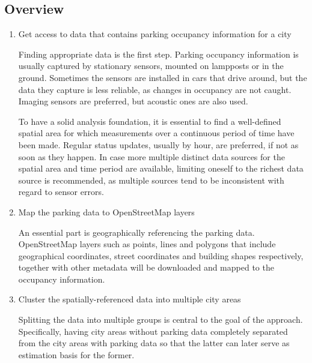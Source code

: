 \documentclass{article}
\begin{document}
	\subsection{Overview}
	
	\begin{enumerate}[label=\Roman*]
		
		
		
		\item{Get access to data that contains parking occupancy information for a city}
		
		Finding appropriate data is the first step. Parking occupancy information is usually captured by stationary sensors, mounted on lampposts or in the ground. Sometimes the sensors are installed in cars that drive around, but the data they capture is less reliable, as changes in occupancy are not caught. Imaging sensors are preferred, but acoustic ones are also used.
		
		To have a solid analysis foundation, it is essential to find a well-defined spatial area for which measurements over a continuous period of time have been made. Regular status updates, usually by hour, are preferred, if not as soon as they happen. In case more multiple distinct data sources for the spatial area and time period are available, limiting oneself to the richest data source is recommended, as multiple sources tend to be inconsistent with regard to sensor errors.

		
		\item{Map the parking data to OpenStreetMap layers}
		
		An essential part is geographically referencing the parking data. OpenStreetMap layers such as points, lines and polygons that include geographical coordinates, street coordinates and building shapes respectively, together with other metadata will be downloaded and mapped to the occupancy information.
		
		\item{Cluster the spatially-referenced data into multiple city areas}
		
		Splitting the data into multiple groups is central to the goal of the approach. Specifically, having city areas without parking data completely separated from the city areas with parking data so that the latter can later serve as estimation basis for the former. 
		

\end{enumerate}
\end{document}
